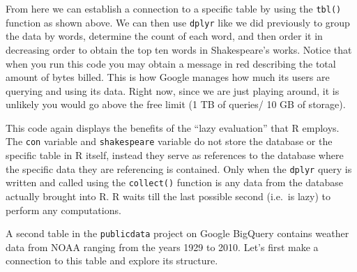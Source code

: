 \documentclass[]{krantz}
\makeatletter
\newenvironment{Shaded}{\begin{snugshade}}{\end{snugshade}}
\newcommand{\KeywordTok}[1]{\textcolor[rgb]{0.27,0.27,0.27}{\textbf{#1}}}
\newcommand{\NormalTok}[1]{#1}
\newcommand{\OperatorTok}[1]{\textcolor[rgb]{0.43,0.43,0.43}{\textbf{#1}}}
\newcommand{\StringTok}[1]{\textcolor[rgb]{0.5,0.5,0.5}{#1}}
\newenvironment{kframe}{%
\medskip{}
\setlength{\fboxsep}{.8em}
 \def\at@end@of@kframe{}%
 \ifinner\ifhmode%
  \def\at@end@of@kframe{\end{minipage}}%
  \begin{minipage}{\columnwidth}%
 \fi\fi%
 \def\FrameCommand##1{\hskip\@totalleftmargin \hskip-\fboxsep
 \colorbox{shadecolor}{##1}\hskip-\fboxsep
     \hskip-\linewidth \hskip-\@totalleftmargin \hskip\columnwidth}%
 \MakeFramed {\advance\hsize-\width
   \@totalleftmargin\z@ \linewidth\hsize
   \@setminipage}}%
 {\par\unskip\endMakeFramed%
 \at@end@of@kframe}
\renewenvironment{Shaded}{\begin{kframe}}{\end{kframe}}
\makeatother
\begin{document}
From here we can establish a connection to a specific table by using the \texttt{tbl()} function as shown above. We can then use \texttt{dplyr} like we did previously to group the data by words, determine the count of each word, and then order it in decreasing order to obtain the top ten words in Shakespeare's works. Notice that when you run this code you may obtain a message in red describing the total amount of bytes billed. This is how Google manages how much its users are querying and using its data. Right now, since we are just playing around, it is unlikely you would go above the free limit (1 TB of queries/ 10 GB of storage).

This code again displays the benefits of the ``lazy evaluation'' that R employs. The \texttt{con} variable and \texttt{shakespeare} variable do not store the database or the specific table in R itself, instead they serve as references to the database where the specific data they are referencing is contained. Only when the \texttt{dplyr} query is written and called using the \texttt{collect()} function is any data from the database actually brought into R. R waits till the last possible second (i.e.~is lazy) to perform any computations.

A second table in the \texttt{publicdata} project on Google BigQuery contains weather data from NOAA ranging from the years 1929 to 2010. Let's first make a connection to this table and explore its structure.

\begin{Shaded}
\end{Shaded}
\end{document}
